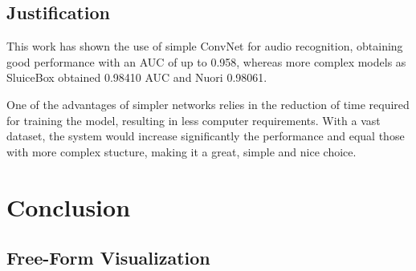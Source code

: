 \documentclass[]{article}
\begin{document}
\subsection{Justification}\label{justification}

This work has shown the use of simple ConvNet for audio recognition, obtaining good performance with an AUC of up to 0.958, whereas more complex models as SluiceBox obtained 0.98410 AUC and Nuori 0.98061. 

One of the advantages of simpler networks relies in the reduction of time required for training the model, resulting in less computer requirements. With a vast dataset, the system would increase significantly the performance and equal those with more complex stucture, making it a great, simple and nice choice. %


\section{Conclusion}\label{v.-conclusion}


\subsection{Free-Form Visualization}\label{free-form-visualization}
\end{document}
